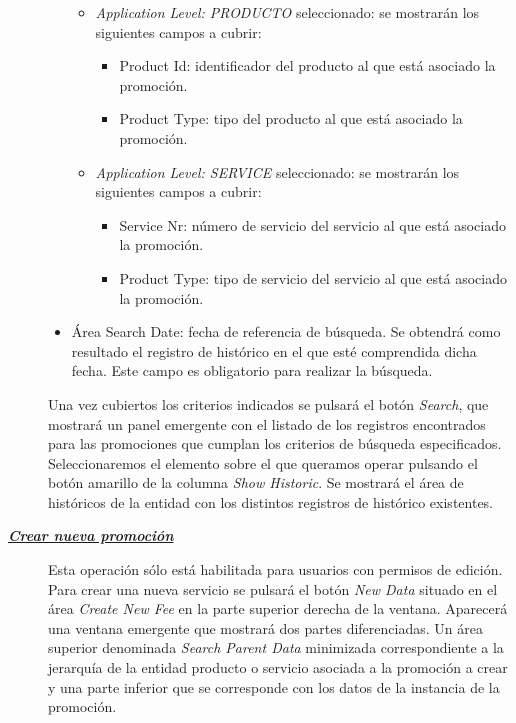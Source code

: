 \begin{description}
\begin{itemize}
	\begin{itemize}
 		\item \emph{Application Level: PRODUCTO} seleccionado: se mostrarán los siguientes campos a cubrir:
			\begin{itemize}
				\item Product Id: identificador del producto al que está asociado la promoción.
				\item Product Type: tipo del producto al que está asociado la promoción.
			\end{itemize}
		\item \emph{Application Level: SERVICE} seleccionado:  se mostrarán los siguientes campos a cubrir:
		\begin{itemize}
			\item Service Nr: número de servicio del servicio al que está asociado la promoción.
			\item Product Type: tipo de servicio del servicio al que está asociado la promoción.
		\end{itemize}
		
	\end{itemize}	    	
	\item Área Search Date: fecha de referencia de búsqueda. Se obtendrá como resultado el registro de histórico en el que esté comprendida dicha fecha. Este campo es obligatorio para realizar la búsqueda.
\end{itemize}

Una vez cubiertos los criterios indicados se pulsará el botón \emph{Search}, que mostrará un panel emergente con el listado de los registros encontrados para las promociones que cumplan los criterios de búsqueda especificados. Seleccionaremos el elemento sobre el que queramos operar pulsando el botón amarillo de la columna \emph{Show Historic}. Se mostrará el área de históricos de la entidad con los distintos registros de histórico existentes.


\item[\underline{\textsl{\textbf{Crear nueva promoción}}}] Esta operación sólo está habilitada para usuarios con permisos de edición.
Para crear una nueva servicio se pulsará el botón \textit{New Data} situado en el área \emph{Create New Fee} en la parte superior derecha de la ventana. Aparecerá una ventana emergente que mostrará dos partes diferenciadas. Un área superior denominada \emph{Search Parent Data} minimizada correspondiente a la jerarquía de la entidad producto o servicio asociada a la promoción a crear y una parte inferior que se corresponde con los datos de la instancia de la promoción.


\end{description}

